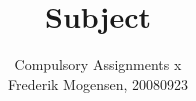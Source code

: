 \documentclass[a4paper,11pt,article,oneside,final]{memoir}
\title{Subject}
\author{
		Compulsory Assignments x\\
		Frederik Mogensen, 20080923 \\ \\
}
\begin{document}
	\sloppy
    \maketitle

    
\end{document}
